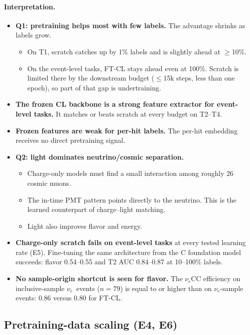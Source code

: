\documentclass[11pt,a4paper]{article}
\newcommand{\nue}{\ensuremath{\nu_e}}
\begin{document}
\paragraph{Interpretation.}
\begin{itemize}
  \item \textbf{Q1: pretraining helps most with few labels.} The advantage shrinks as labels grow.
  \begin{itemize}
    \item On T1, scratch catches up by 1\% labels and is slightly ahead at $\ge$10\%.
    \item On the event-level tasks, FT-CL stays ahead even at 100\%. Scratch is limited there by the downstream budget ($\le$15k steps, less than one epoch), so part of that gap is undertraining.
  \end{itemize}
  \item \textbf{The frozen CL backbone is a strong feature extractor for event-level tasks.} It matches or beats scratch at every budget on T2--T4.
  \item \textbf{Frozen features are weak for per-hit labels.} The per-hit embedding receives no direct pretraining signal.
  \item \textbf{Q2: light dominates neutrino/cosmic separation.}
  \begin{itemize}
    \item Charge-only models must find a small interaction among roughly 26 cosmic muons.
    \item The in-time PMT pattern points directly to the neutrino. This is the learned counterpart of charge--light matching.
    \item Light also improves flavor and energy.
  \end{itemize}
  \item \textbf{Charge-only scratch fails on event-level tasks} at every tested learning rate (E5). Fine-tuning the same architecture from the C foundation model succeeds: flavor 0.54--0.55 and T2 AUC 0.84--0.87 at 10--100\% labels.
  \item \textbf{No sample-origin shortcut is seen for flavor.} The \nue CC efficiency on inclusive-sample \nue\ events ($n{=}79$) is equal to or higher than on \nue-sample events: 0.86 versus 0.80 for FT-CL.
\end{itemize}

\subsection{Pretraining-data scaling (E4, E6)}
\end{document}
